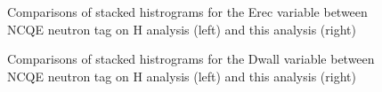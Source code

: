 \begin{figure}[!htbp]
    \centering
    
    \caption{Comparisons of stacked histrograms for the Erec variable between NCQE neutron tag on H analysis (left) and this analysis (right)} \label{fig:erec_reduction} 
    
      \hfill 
     \par
    
        
\end{figure}

\begin{figure}[!htbp]
    \centering
    
    \caption{Comparisons of stacked histrograms for the Dwall variable between NCQE neutron tag on H analysis (left) and this analysis (right)} \label{fig:dwall_reduction} 
    
      \hfill 
      \par
    
        
\end{figure}

